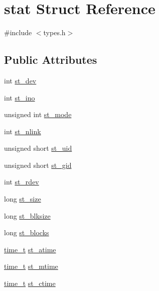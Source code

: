 \hypertarget{structstat}{}\section{stat Struct Reference}
\label{structstat}


{\ttfamily \#include $<$types.\+h$>$}

\subsection*{Public Attributes}
\begin{DoxyCompactItemize}
\item 
int \mbox{\hyperlink{structstat_a80bdfc2e3289b57eb9939aaa5fa1f570}{st\+\_\+dev}}
\item 
int \mbox{\hyperlink{structstat_a12ab118770f050cd0c6eeb53f0a3bc04}{st\+\_\+ino}}
\item 
unsigned int \mbox{\hyperlink{structstat_a00cd6f23b3cbc64221f90e7b019bc064}{st\+\_\+mode}}
\item 
int \mbox{\hyperlink{structstat_a764f30814326ac3ecb061b35d812f5f4}{st\+\_\+nlink}}
\item 
unsigned short \mbox{\hyperlink{structstat_a5d5f186135107ad27e7598919a40bdbd}{st\+\_\+uid}}
\item 
unsigned short \mbox{\hyperlink{structstat_a0a816257595eebd717ab8b9f7cb6e8d8}{st\+\_\+gid}}
\item 
int \mbox{\hyperlink{structstat_a236f1eed46fc5eecf87ef22318ae8422}{st\+\_\+rdev}}
\item 
long \mbox{\hyperlink{structstat_a66969473ec3e1e4b6cdfb655b93a1dee}{st\+\_\+size}}
\item 
long \mbox{\hyperlink{structstat_a44c8d9651d7fd08e741f325a81b7beb7}{st\+\_\+blksize}}
\item 
long \mbox{\hyperlink{structstat_a633f6f479042b721792de917108228e9}{st\+\_\+blocks}}
\item 
\mbox{\hyperlink{time_8h_aec517130c026730881898750d76e596f}{time\+\_\+t}} \mbox{\hyperlink{structstat_ab74d1e7e345e88b9d0fb2688a97cba64}{st\+\_\+atime}}
\item 
\mbox{\hyperlink{time_8h_aec517130c026730881898750d76e596f}{time\+\_\+t}} \mbox{\hyperlink{structstat_a77e235090f8cb6897f1c0ce65689006b}{st\+\_\+mtime}}
\item 
\mbox{\hyperlink{time_8h_aec517130c026730881898750d76e596f}{time\+\_\+t}} \mbox{\hyperlink{structstat_a1b4b858db1ebe79c3d6e0fc1ef721024}{st\+\_\+ctime}}
\end{DoxyCompactItemize}


